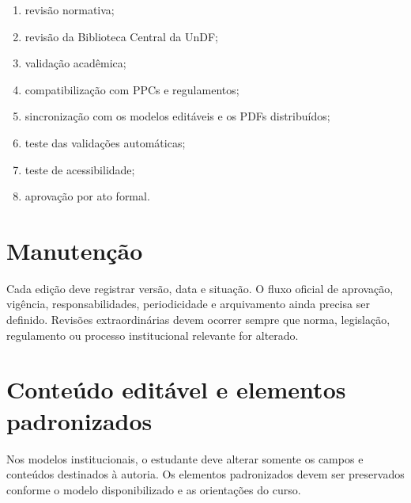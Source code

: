 \begin{enumerate}
  \item revisão normativa;
  \item revisão da Biblioteca Central da UnDF;
  \item validação acadêmica;
  \item compatibilização com PPCs e regulamentos;
  \item sincronização com os modelos editáveis e os PDFs distribuídos;
  \item teste das validações automáticas;
  \item teste de acessibilidade;
  \item aprovação por ato formal.
\end{enumerate}

\section{Manutenção}

Cada edição deve registrar versão, data e situação. O fluxo oficial de aprovação, vigência, responsabilidades, periodicidade e arquivamento ainda precisa ser definido. Revisões extraordinárias devem ocorrer sempre que norma, legislação, regulamento ou processo institucional relevante for alterado.

\section{Conteúdo editável e elementos padronizados}

Nos modelos institucionais, o estudante deve alterar somente os campos e conteúdos destinados à autoria. Os elementos padronizados devem ser preservados conforme o modelo disponibilizado e as orientações do curso.
